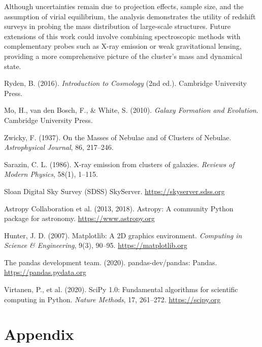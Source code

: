 \documentclass[12pt]{article}
\begin{document}
Although uncertainties remain due to projection effects, sample size, and the 
assumption of virial equilibrium, the analysis demonstrates the utility of 
redshift surveys in probing the mass distribution of large-scale structures. 
Future extensions of this work could involve combining spectroscopic methods 
with complementary probes such as X-ray emission or weak gravitational lensing, 
providing a more comprehensive picture of the cluster’s mass and dynamical state.
\newpage\begin{thebibliography}{9}

    Ryden, B. (2016). \textit{Introduction to Cosmology} (2nd ed.). Cambridge University Press.
    
    Mo, H., van den Bosch, F., \& White, S. (2010). \textit{Galaxy Formation and Evolution}. Cambridge University Press.
    
    Zwicky, F. (1937). On the Masses of Nebulae and of Clusters of Nebulae. \textit{Astrophysical Journal}, 86, 217–246.
    
    Sarazin, C. L. (1986). X-ray emission from clusters of galaxies. \textit{Reviews of Modern Physics}, 58(1), 1–115.
    
    Sloan Digital Sky Survey (SDSS) SkyServer. \url{https://skyserver.sdss.org}
    
    Astropy Collaboration et al. (2013, 2018). Astropy: A community Python package for astronomy. \url{https://www.astropy.org}
    
    Hunter, J. D. (2007). Matplotlib: A 2D graphics environment. \textit{Computing in Science \& Engineering}, 9(3), 90–95. \url{https://matplotlib.org}
    
    The pandas development team. (2020). pandas-dev/pandas: Pandas. \url{https://pandas.pydata.org}
    
    Virtanen, P., et al. (2020). SciPy 1.0: Fundamental algorithms for scientific computing in Python. \textit{Nature Methods}, 17, 261–272. \url{https://scipy.org}
    
    \end{thebibliography}

    \appendix
\section*{Appendix}
\end{document}

